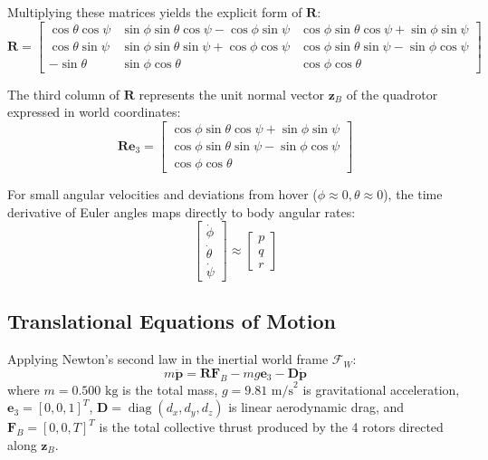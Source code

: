 \documentclass[11pt,a4paper]{article}
\begin{document}
Multiplying these matrices yields the explicit form of $\mathbf{R}$:
\begin{equation}
\mathbf{R} = \begin{bmatrix}
\cos\theta \cos\psi & \sin\phi \sin\theta \cos\psi - \cos\phi \sin\psi & \cos\phi \sin\theta \cos\psi + \sin\phi \sin\psi \\
\cos\theta \sin\psi & \sin\phi \sin\theta \sin\psi + \cos\phi \cos\psi & \cos\phi \sin\theta \sin\psi - \sin\phi \cos\psi \\
-\sin\theta & \sin\phi \cos\theta & \cos\phi \cos\theta
\end{bmatrix}
\label{eq:rot_matrix}
\end{equation}

The third column of $\mathbf{R}$ represents the unit normal vector $\mathbf{z}_B$ of the quadrotor expressed in world coordinates:
\begin{equation}
\mathbf{R} \mathbf{e}_3 = \begin{bmatrix} 
\cos\phi \sin\theta \cos\psi + \sin\phi \sin\psi \\
\cos\phi \sin\theta \sin\psi - \sin\phi \cos\psi \\
\cos\phi \cos\theta
\end{bmatrix}
\label{eq:thrust_direction}
\end{equation}

For small angular velocities and deviations from hover ($\phi \approx 0, \theta \approx 0$), the time derivative of Euler angles maps directly to body angular rates:
\begin{equation}
\begin{bmatrix} \dot{\phi} \\ \dot{\theta} \\ \dot{\psi} \end{bmatrix} \approx \begin{bmatrix} p \\ q \\ r \end{bmatrix}
\end{equation}

\subsection{Translational Equations of Motion}
Applying Newton's second law in the inertial world frame $\mathcal{F}_W$:
\begin{equation}
m \mathbf{\ddot{p}} = \mathbf{R} \mathbf{F}_B - m g \mathbf{e}_3 - \mathbf{D} \mathbf{\dot{p}}
\end{equation}
where $m = 0.500\text{ kg}$ is the total mass, $g = 9.81\text{ m/s}^2$ is gravitational acceleration, $\mathbf{e}_3 = [0, 0, 1]^T$, $\mathbf{D} = \operatorname{diag}(d_x, d_y, d_z)$ is linear aerodynamic drag, and $\mathbf{F}_B = [0, 0, T]^T$ is the total collective thrust produced by the 4 rotors directed along $\mathbf{z}_B$.
\end{document}
